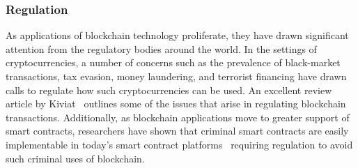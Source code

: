 \subsubsection{Regulation}
As applications of blockchain technology proliferate, they have drawn significant attention from the regulatory bodies around the world.  In the settings of cryptocurrencies, a number of concerns such as the prevalence of black-market transactions, tax evasion, money laundering, and terrorist financing have drawn calls to regulate how such cryptocurrencies can be used.  An excellent review article by Kiviat~\cite{Kiviat15} outlines some of the issues that arise in regulating blockchain transactions.  Additionally, as blockchain applications move to greater support of smart contracts, researchers have shown that criminal smart contracts are easily implementable in today's smart contract platforms~\cite{CCS:JueKosShi16} requiring regulation to avoid such criminal uses of blockchain.  

%
